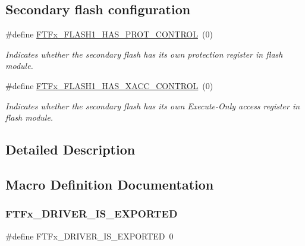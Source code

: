 \subsection*{Secondary flash configuration}
\begin{DoxyCompactItemize}
\item 
\mbox{\label{group__ftfx__feature_gadaaa8d049e882a02f6de4d62511de3f6}} 
\#define \mbox{\hyperlink{group__ftfx__feature_gadaaa8d049e882a02f6de4d62511de3f6}{F\+T\+Fx\+\_\+\+F\+L\+A\+S\+H1\+\_\+\+H\+A\+S\+\_\+\+P\+R\+O\+T\+\_\+\+C\+O\+N\+T\+R\+OL}}~(0)
\begin{DoxyCompactList}\small\item\em Indicates whether the secondary flash has its own protection register in flash module. \end{DoxyCompactList}\item 
\mbox{\label{group__ftfx__feature_ga580a13d61af6e50d59aaa2d2adb84cc9}} 
\#define \mbox{\hyperlink{group__ftfx__feature_ga580a13d61af6e50d59aaa2d2adb84cc9}{F\+T\+Fx\+\_\+\+F\+L\+A\+S\+H1\+\_\+\+H\+A\+S\+\_\+\+X\+A\+C\+C\+\_\+\+C\+O\+N\+T\+R\+OL}}~(0)
\begin{DoxyCompactList}\small\item\em Indicates whether the secondary flash has its own Execute-\/\+Only access register in flash module. \end{DoxyCompactList}\end{DoxyCompactItemize}


\subsection{Detailed Description}


\subsection{Macro Definition Documentation}
\mbox{\label{group__ftfx__feature_gabda161d7ab04497e8004c067f5d849e0}} 
\subsubsection{\texorpdfstring{FTFx\_DRIVER\_IS\_EXPORTED}{FTFx\_DRIVER\_IS\_EXPORTED}}
{\footnotesize\ttfamily \#define F\+T\+Fx\+\_\+\+D\+R\+I\+V\+E\+R\+\_\+\+I\+S\+\_\+\+E\+X\+P\+O\+R\+T\+ED~0}



